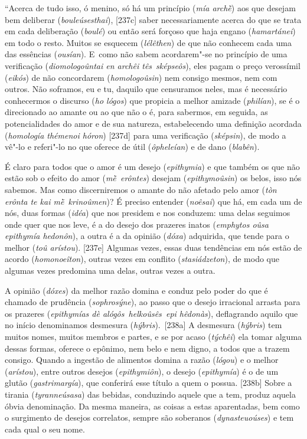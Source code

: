 ``Acerca de tudo isso, ó menino, só há um princípio (\emph{mía archḕ})
aos que desejam bem deliberar (\emph{bouleúsesthai}), [237c] saber
necessariamente acerca do que se trata em cada deliberação
(\emph{boulé}) ou então será forçoso que haja engano (\emph{hamartánei})
em todo o resto. Muitos se esquecem (\emph{lélêthen}) de que não
conhecem cada uma das essências (\emph{ousían}). E~como não sabem
acordarem"-se no princípio de uma verificação (\emph{diomologoûntai en
archêi tês}~\emph{sképseôs}), eles pagam o preço verossímil
(\emph{eikós}) de não concordarem (\emph{homologoûsin}) nem consigo
mesmos, nem com outros. Não soframos, eu e tu, daquilo que censuramos
neles, mas é necessário conhecermos o discurso (\emph{ho lógos}) que
propicia a melhor amizade (\emph{philían}), se é o direcionado ao amante
ou ao que não o é, para sabermos, em seguida, as potencialidades do amor
e de sua natureza, estabelecendo uma definição acordada (\emph{homología
thémenoi hóron}) [237d] para uma verificação (\emph{sképsin}), de
modo a vê"-lo e referi"-lo no que oferece de útil (\emph{ôpheleían}) e de
dano (\emph{blabên}).

É claro para todos que o amor é um desejo (\emph{epithymia}) e que
também os que não estão sob o efeito do amor (\emph{mḕ~erôntes}) desejam
(\emph{epithymoûsin}) os belos, isso nós sabemos. Mas como discerniremos
o amante do não afetado pelo amor (\emph{tòn erônta te kai
mḕ~krinoûmen})? É preciso entender (\emph{noêsai}) que há, em cada um de
nós, duas formas (\emph{idéa}) que nos presidem e nos conduzem: uma
delas seguimos onde quer que nos leve, é a do desejo dos prazeres inatos
(\emph{emphytos oûsa epithymía hedonôn}), a outra é a da opinião
(\emph{dóxa}) adquirida, que tende para o melhor (\emph{toû arístou}).
[237e] Algumas vezes, essas duas tendências em nós estão de acordo
(\emph{homonoeîton}), outras vezes em conflito (\emph{stasiádzeton}), de
modo que algumas vezes predomina uma delas, outras vezes a outra.

A opinião (\emph{dóxes}) da melhor razão domina e conduz pelo poder do
que é chamado de prudência (\emph{sophrosýne}), ao passo que o desejo
irracional arrasta para os prazeres (\emph{epithymías dè
alógôs~helkoûsês~epi hêdonàs}), deflagrando aquilo que no início
denominamos desmesura (\emph{hýbris}).~[238a] A desmesura
(\emph{hýbris}) tem muitos nomes, muitos membros e partes, e se por
acaso (\emph{týchêi}) ela tomar alguma dessas formas, oferece o epônimo,
nem belo e nem digno, a todos que a trazem consigo. Quando a ingestão de
alimentos domina a razão (\emph{lógou}) e o melhor (\emph{arístou}),
entre outros desejos (\emph{epithymiôn}), o desejo (\emph{epithymía}) é
o de um glutão (\emph{gastrimargía}), que conferirá esse título a quem o
possua. [238b] Sobre a tirania (\emph{tyranneúsasa}) das bebidas,
conduzindo aquele que a tem, produz aquela óbvia denominação. Da mesma
maneira, as coisas a estas aparentadas, bem como o surgimento de desejos
correlatos, sempre são soberanos (\emph{dynasteuoúses}) e tem cada qual
o seu nome.

